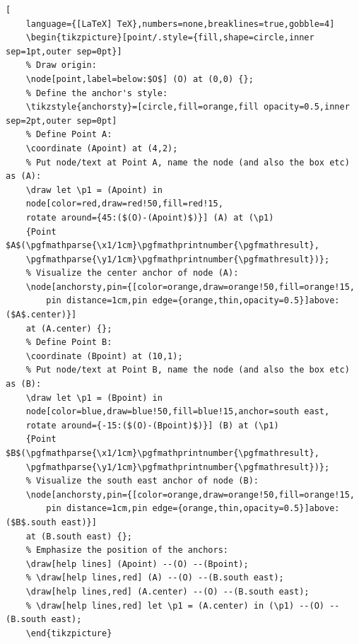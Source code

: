 \documentclass[lualatex]{jlreq}
\begin{document}
\begin{lstlisting}[
    language={[LaTeX] TeX},numbers=none,breaklines=true,gobble=4]
    \begin{tikzpicture}[point/.style={fill,shape=circle,inner sep=1pt,outer sep=0pt}]
    % Draw origin:
    \node[point,label=below:$O$] (O) at (0,0) {};
    % Define the anchor's style:
    \tikzstyle{anchorsty}=[circle,fill=orange,fill opacity=0.5,inner sep=2pt,outer sep=0pt]
    % Define Point A:
    \coordinate (Apoint) at (4,2);
    % Put node/text at Point A, name the node (and also the box etc) as (A):
    \draw let \p1 = (Apoint) in
    node[color=red,draw=red!50,fill=red!15,
    rotate around={45:($(O)-(Apoint)$)}] (A) at (\p1)
    {Point $A$(\pgfmathparse{\x1/1cm}\pgfmathprintnumber{\pgfmathresult},
    \pgfmathparse{\y1/1cm}\pgfmathprintnumber{\pgfmathresult})};
    % Visualize the center anchor of node (A):
    \node[anchorsty,pin={[color=orange,draw=orange!50,fill=orange!15,
        pin distance=1cm,pin edge={orange,thin,opacity=0.5}]above:($A$.center)}]
    at (A.center) {};
    % Define Point B:
    \coordinate (Bpoint) at (10,1);
    % Put node/text at Point B, name the node (and also the box etc) as (B):
    \draw let \p1 = (Bpoint) in
    node[color=blue,draw=blue!50,fill=blue!15,anchor=south east,
    rotate around={-15:($(O)-(Bpoint)$)}] (B) at (\p1)
    {Point $B$(\pgfmathparse{\x1/1cm}\pgfmathprintnumber{\pgfmathresult},
    \pgfmathparse{\y1/1cm}\pgfmathprintnumber{\pgfmathresult})};
    % Visualize the south east anchor of node (B):
    \node[anchorsty,pin={[color=orange,draw=orange!50,fill=orange!15,
        pin distance=1cm,pin edge={orange,thin,opacity=0.5}]above:($B$.south east)}]
    at (B.south east) {};
    % Emphasize the position of the anchors:
    \draw[help lines] (Apoint) --(O) --(Bpoint);
    % \draw[help lines,red] (A) --(O) --(B.south east);
    \draw[help lines,red] (A.center) --(O) --(B.south east);
    % \draw[help lines,red] let \p1 = (A.center) in (\p1) --(O) --(B.south east);
    \end{tikzpicture}
\end{lstlisting}
\end{document}
